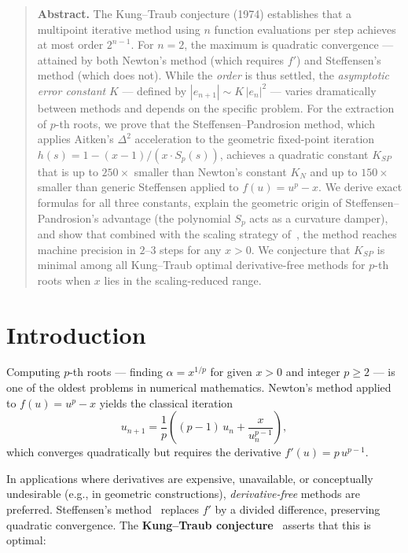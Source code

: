 \documentclass[10pt,a4paper,oneside]{book}
\theoremstyle{definition}
\theoremstyle{remark}
\newenvironment{abstract}{\begin{quote}\small\textbf{Abstract.}}{\end{quote}}
\begin{document}
\begin{abstract}
The Kung--Traub conjecture (1974) establishes that a multipoint iterative method using $n$ function evaluations per step achieves at most order $2^{n-1}$.  For $n=2$, the maximum is quadratic convergence --- attained by both Newton's method (which requires $f'$) and Steffensen's method (which does not).  While the \emph{order} is thus settled, the \emph{asymptotic error constant} $K$ --- defined by $|e_{n+1}| \sim K\,|e_n|^2$ --- varies dramatically between methods and depends on the specific problem.  For the extraction of $p$-th roots, we prove that the Steffensen--Pandrosion method, which applies Aitken's $\Delta^2$ acceleration to the geometric fixed-point iteration $h(s) = 1 - (x-1)/(x\cdot S_p(s))$, achieves a quadratic constant $K_{SP}$ that is up to $250\times$ smaller than Newton's constant $K_N$ and up to $150\times$ smaller than generic Steffensen applied to $f(u) = u^p - x$.  We derive exact formulas for all three constants, explain the geometric origin of Steffensen--Pandrosion's advantage (the polynomial $S_p$ acts as a curvature damper), and show that combined with the scaling strategy of~\cite{besevic2026}, the method reaches machine precision in $2$--$3$ steps for any $x > 0$.  We conjecture that $K_{SP}$ is minimal among all Kung--Traub optimal derivative-free methods for $p$-th roots when $x$ lies in the scaling-reduced range.
\end{abstract}

\bigskip

\section{Introduction}

Computing $p$-th roots --- finding $\alpha = x^{1/p}$ for given $x > 0$ and integer $p \geq 2$ --- is one of the oldest problems in numerical mathematics.  Newton's method applied to $f(u) = u^p - x$ yields the classical iteration
\begin{equation}
  \label{eq:newton}
  u_{n+1} = \frac{1}{p}\left((p-1)\,u_n + \frac{x}{u_n^{p-1}}\right),
\end{equation}
which converges quadratically but requires the derivative $f'(u) = p\,u^{p-1}$.

\medskip

In applications where derivatives are expensive, unavailable, or conceptually undesirable (e.g., in geometric constructions), \emph{derivative-free} methods are preferred.  Steffensen's method~\cite{steffensen} replaces $f'$ by a divided difference, preserving quadratic convergence.  The \textbf{Kung--Traub conjecture}~\cite{kungtraub} asserts that this is optimal:
\end{document}
